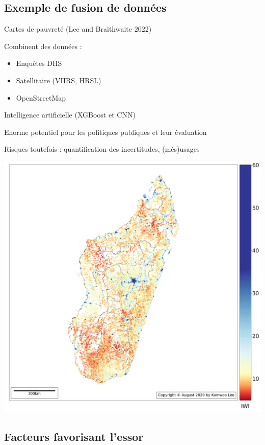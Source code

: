 \documentclass[
  letterpaper,
  DIV=11,
  numbers=noendperiod]{scrartcl}
\providecommand{\tightlist}{%
  \setlength{\itemsep}{0pt}\setlength{\parskip}{0pt}}\usepackage{longtable,booktabs,array}
\begin{document}
\hypertarget{exemple-de-fusion-de-donnuxe9es}{%
\subsection{Exemple de fusion de
données}\label{exemple-de-fusion-de-donnuxe9es}}

Cartes de pauvreté (Lee and Braithwaite 2022)

Combinent des données :

\begin{itemize}
\tightlist
\item
  Enquêtes DHS
\item
  Satellitaire (VIIRS, HRSL)
\item
  OpenStreetMap
\end{itemize}

Intelligence artificielle (XGBoost et CNN)

Enorme potentiel pour les politiques publiques et leur évaluation

Risques toutefois : quantification des incertitudes, (més)usages

\includegraphics{sources/Poverty_Madagascar.jpg}

\hypertarget{facteurs-favorisant-lessor}{%
\subsection{Facteurs favorisant
l'essor}\label{facteurs-favorisant-lessor}}
\end{document}
